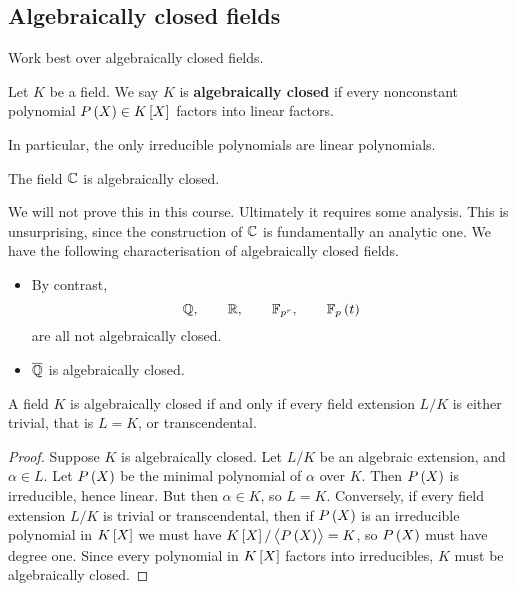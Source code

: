 \subsection{Algebraically closed fields}

Work best over algebraically closed fields.

\begin{definition}
Let $ K $ be a field. We say $ K $ is \textbf{algebraically closed} if every nonconstant polynomial $ P\br{X} \in K\sbr{X} $ factors into linear factors.
\end{definition}

In particular, the only irreducible polynomials are linear polynomials.

\begin{theorem}
The field $ \mathbb{C} $ is algebraically closed.
\end{theorem}

We will not prove this in this course. Ultimately it requires some analysis. This is unsurprising, since the construction of $ \mathbb{C} $ is fundamentally an analytic one. We have the following characterisation of algebraically closed fields.

\begin{example*}
\hfill
\begin{itemize}
\item By contrast,
$$ \Q, \qquad \R, \qquad \F_{p^r}, \qquad \F_p\br{t} $$
are all not algebraically closed.
\item $ \overline{\mathbb{Q}} $ is algebraically closed.
\end{itemize}
\end{example*}

\begin{lemma}
A field $ K $ is algebraically closed if and only if every field extension $ L / K $ is either trivial, that is $ L = K $, or transcendental.
\end{lemma}

\begin{proof}
Suppose $ K $ is algebraically closed. Let $ L / K $ be an algebraic extension, and $ \alpha \in L $. Let $ P\br{X} $ be the minimal polynomial of $ \alpha $ over $ K $. Then $ P\br{X} $ is irreducible, hence linear. But then $ \alpha \in K $, so $ L = K $. Conversely, if every field extension $ L / K $ is trivial or transcendental, then if $ P\br{X} $ is an irreducible polynomial in $ K\sbr{X} $ we must have $ K\sbr{X} / \abr{P\br{X}} = K $, so $ P\br{X} $ must have degree one. Since every polynomial in $ K\sbr{X} $ factors into irreducibles, $ K $ must be algebraically closed.
\end{proof}

